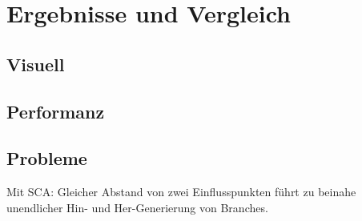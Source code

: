 \chapter{Ergebnisse und Vergleich}

\section{Visuell}

\section{Performanz}

\section{Probleme}

Mit SCA: Gleicher Abstand von zwei Einflusspunkten führt zu beinahe unendlicher Hin- und Her-Generierung von Branches.